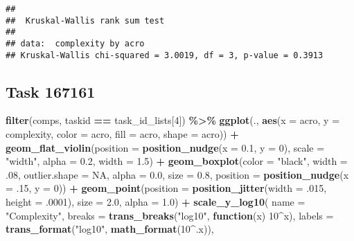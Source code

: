 \documentclass[
]{book}
\newenvironment{Shaded}{\begin{snugshade}}{\end{snugshade}}
\newcommand{\AttributeTok}[1]{\textcolor[rgb]{0.13,0.29,0.53}{#1}}
\newcommand{\ConstantTok}[1]{\textcolor[rgb]{0.56,0.35,0.01}{#1}}
\newcommand{\ControlFlowTok}[1]{\textcolor[rgb]{0.13,0.29,0.53}{\textbf{#1}}}
\newcommand{\DecValTok}[1]{\textcolor[rgb]{0.00,0.00,0.81}{#1}}
\newcommand{\FloatTok}[1]{\textcolor[rgb]{0.00,0.00,0.81}{#1}}
\newcommand{\FunctionTok}[1]{\textcolor[rgb]{0.13,0.29,0.53}{\textbf{#1}}}
\newcommand{\NormalTok}[1]{#1}
\newcommand{\SpecialCharTok}[1]{\textcolor[rgb]{0.81,0.36,0.00}{\textbf{#1}}}
\newcommand{\StringTok}[1]{\textcolor[rgb]{0.31,0.60,0.02}{#1}}
\begin{document}
\begin{verbatim}
## 
##  Kruskal-Wallis rank sum test
## 
## data:  complexity by acro
## Kruskal-Wallis chi-squared = 3.0019, df = 3, p-value = 0.3913
\end{verbatim}

\hypertarget{task-167161-1}{%
\subsection{Task 167161}\label{task-167161-1}}

\begin{Shaded}
\begin{Highlighting}[]
\FunctionTok{filter}\NormalTok{(comps, taskid }\SpecialCharTok{==}\NormalTok{ task\_id\_lists[}\DecValTok{4}\NormalTok{]) }\SpecialCharTok{\%\textgreater{}\%}
  \FunctionTok{ggplot}\NormalTok{(., }\FunctionTok{aes}\NormalTok{(}\AttributeTok{x =}\NormalTok{ acro, }\AttributeTok{y =}\NormalTok{ complexity, }\AttributeTok{color =}\NormalTok{ acro,}
                \AttributeTok{fill =}\NormalTok{ acro, }\AttributeTok{shape =}\NormalTok{ acro)) }\SpecialCharTok{+}
  \FunctionTok{geom\_flat\_violin}\NormalTok{(}\AttributeTok{position =} \FunctionTok{position\_nudge}\NormalTok{(}\AttributeTok{x =} \FloatTok{0.1}\NormalTok{, }\AttributeTok{y =} \DecValTok{0}\NormalTok{),}
                   \AttributeTok{scale =} \StringTok{"width"}\NormalTok{, }\AttributeTok{alpha =} \FloatTok{0.2}\NormalTok{, }\AttributeTok{width =} \FloatTok{1.5}\NormalTok{) }\SpecialCharTok{+}
  \FunctionTok{geom\_boxplot}\NormalTok{(}\AttributeTok{color =} \StringTok{"black"}\NormalTok{, }\AttributeTok{width =}\NormalTok{ .}\DecValTok{08}\NormalTok{, }\AttributeTok{outlier.shape =} \ConstantTok{NA}\NormalTok{, }\AttributeTok{alpha =} \FloatTok{0.0}\NormalTok{,}
               \AttributeTok{size =} \FloatTok{0.8}\NormalTok{, }\AttributeTok{position =} \FunctionTok{position\_nudge}\NormalTok{(}\AttributeTok{x =}\NormalTok{ .}\DecValTok{15}\NormalTok{, }\AttributeTok{y =} \DecValTok{0}\NormalTok{)) }\SpecialCharTok{+}
  \FunctionTok{geom\_point}\NormalTok{(}\AttributeTok{position =} \FunctionTok{position\_jitter}\NormalTok{(}\AttributeTok{width =}\NormalTok{ .}\DecValTok{015}\NormalTok{, }\AttributeTok{height =}\NormalTok{ .}\DecValTok{0001}\NormalTok{),}
             \AttributeTok{size =} \FloatTok{2.0}\NormalTok{, }\AttributeTok{alpha =} \FloatTok{1.0}\NormalTok{) }\SpecialCharTok{+}
  \FunctionTok{scale\_y\_log10}\NormalTok{(}
    \AttributeTok{name =} \StringTok{"Complexity"}\NormalTok{,}
    \AttributeTok{breaks =} \FunctionTok{trans\_breaks}\NormalTok{(}\StringTok{"log10"}\NormalTok{, }\ControlFlowTok{function}\NormalTok{(x) }\DecValTok{10}\SpecialCharTok{\^{}}\NormalTok{x),}
    \AttributeTok{labels =} \FunctionTok{trans\_format}\NormalTok{(}\StringTok{"log10"}\NormalTok{, }\FunctionTok{math\_format}\NormalTok{(}\DecValTok{10}\SpecialCharTok{\^{}}\NormalTok{.x)),}


\end{Highlighting}
\end{Shaded}
\end{document}
